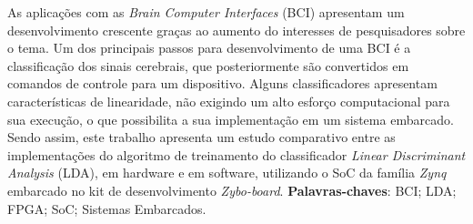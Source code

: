 \begin{resumo}

 \vspace{\onelineskip}
 As aplicações com as \textit{Brain Computer Interfaces} (BCI) apresentam um desenvolvimento crescente graças ao aumento do interesses de pesquisadores sobre o tema. Um dos principais passos para desenvolvimento de uma BCI é a classificação dos sinais cerebrais, que posteriormente são convertidos em comandos de controle para um dispositivo. Alguns classificadores apresentam características de linearidade, não exigindo um alto esforço computacional para sua execução, o que possibilita a sua implementação em um sistema embarcado. Sendo assim, este trabalho apresenta um estudo comparativo entre as implementações do algoritmo de treinamento  do classificador \textit{Linear Discriminant Analysis} (LDA), em hardware e em software, utilizando o SoC da família \textit{Zynq} embarcado no kit de desenvolvimento \textit{Zybo-board}.
 \noindent
 \vspace{\onelineskip}
 \textbf{Palavras-chaves}: BCI; LDA; FPGA; SoC; Sistemas Embarcados.
\end{resumo}
